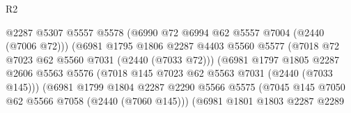 \begin{lexlean}{R2}
\begin{coremodule}
                                            @2287
                                            @5307
                                            @5557
                                            @5578
                                            (@6990 @72 @6994 @62 @5557 @7004 (@2440 (@7006 @72)))
                                            (@6981
                                              @1795
                                              @1806
                                              @2287
                                              @4403
                                              @5560
                                              @5577
                                              (@7018 @72 @7023 @62 @5560 @7031 (@2440 (@7033 @72)))
                                              (@6981
                                                @1797
                                                @1805
                                                @2287
                                                @2606
                                                @5563
                                                @5576
                                                (@7018
                                                  @145
                                                  @7023
                                                  @62
                                                  @5563
                                                  @7031
                                                  (@2440 (@7033 @145)))
                                                (@6981
                                                  @1799
                                                  @1804
                                                  @2287
                                                  @2290
                                                  @5566
                                                  @5575
                                                  (@7045
                                                    @145
                                                    @7050
                                                    @62
                                                    @5566
                                                    @7058
                                                    (@2440 (@7060 @145)))
                                                  (@6981
                                                    @1801
                                                    @1803
                                                    @2287
                                                    @2289

\end{coremodule}
\end{lexlean}
